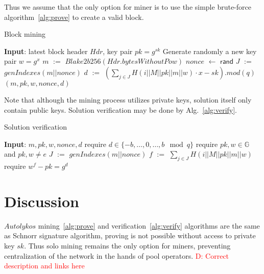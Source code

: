 \documentclass[]{article}
\newcommand{\dnote}[1]{\textcolor{red}{D: {#1}}}
\newcommand{\Name}{$Autolykos$}
\def\Let#1#2{\State #1 $:=$ #2}
\def\LetRnd#1#2{\State #1 $\gets$ #2}
\begin{document}
    Thus we assume that the only option for miner is to use the simple brute-force algorithm~\ref{alg:prove} to
    create a valid block.

    \begin{algorithm}[H]
        \caption{Block mining}
        \label{alg:prove}
        \begin{algorithmic}[1]
            \State \textbf{Input}: latest block header $Hdr$, key pair $pk=g^{sk}$
            \State Generate randomly a new key pair $w=g^x$
            \Let{$m$}{$Blake2b256(Hdr.bytesWithoutPow)$}
            \LetRnd{$nonce$}{$\mathsf{rand}$}
            \Let{$J$}{$genIndexes(m||nonce)$}
            \Let{$d$}{$(\sum_{j \in J}{H(i||M||pk||m||w)} \cdot x - sk).mod(q)$}
            \State \Return $(m,pk,w,nonce,d)$
            \EndIf
            \EndWhile
        \end{algorithmic}
    \end{algorithm}

    Note that although the mining process utilizes private keys, solution itself
    only contain public keys. Solution verification may be done by Alg.~\ref{alg:verify}.

    \begin{algorithm}[H]
        \caption{Solution verification}
        \label{alg:verify}
        \begin{algorithmic}[1]
            \State \textbf{Input}: $m,pk,w,nonce,d$
            \State require $d\in\{-b,\dots,0,\dots, b\mod q\}$
            \State require $pk,w\in \mathbb{G}$ and $pk,w \ne e$
            \Let{$J$}{$genIndexes(m||nonce)$}
            \Let{$f$}{$\sum_{j \in J} H(i||M||pk||m||w)$}
            \State require $w^f - pk = g^d$
        \end{algorithmic}
    \end{algorithm}

    \section{Discussion}
    \label{discussion}

    \Name{} mining~\ref{alg:prove} and verification~\ref{alg:verify} algorithms are
    the same as Schnorr signature algorithm, proving is not possible without access
    to private key $sk$. Thus solo mining remains the only option for miners,
    preventing centralization of the network in the hands of pool operators.
    \dnote{Correct description and links here}
\end{document}
